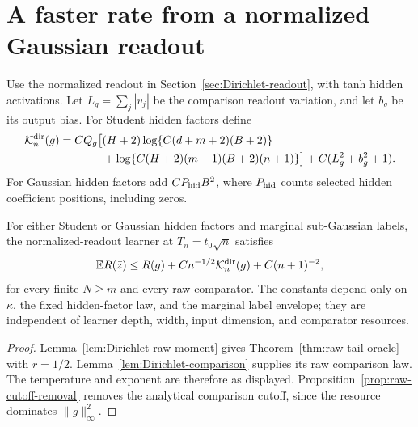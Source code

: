 \section{A faster rate from a normalized Gaussian readout}
\label{sec:dirichlet-raw-oracle}
Use the normalized readout in Section~\ref{sec:Dirichlet-readout}, with
tanh hidden activations. Let $L_g=\sum_j|v_j|$ be the comparison readout variation, and let $b_g$ be its output bias. For Student hidden factors define
\begin{align*}
\mathcal K_n^{\rm dir}(g)=C Q_g\big[&(H+2)\log\{C(d+m+2)(B+2)\}\\
&+\log\{C(H+2)(m+1)(B+2)(n+1)\}\big]+C(L_g^2+b_g^2+1).
\end{align*}
For Gaussian hidden factors add $CP_{\rm hid}B^2$, where $P_{\rm hid}$ counts selected hidden coefficient positions, including zeros.

\begin{corollary}
\label{cor:dirichlet-raw-subgaussian}
For either Student or Gaussian hidden factors and marginal sub-Gaussian labels, the normalized-readout learner at
$T_n=t_0\sqrt n$ satisfies
\[
 \mathbb E R(\bar z)\le R(g)+C n^{-1/2}\mathcal K_n^{\rm dir}(g)
                         +C(n+1)^{-2},
\]
for every finite $N\ge m$ and every raw comparator. The constants depend only on
$\kappa$, the fixed hidden-factor law, and the marginal label envelope; they are independent of
learner depth, width, input dimension, and comparator resources.
\end{corollary}
\begin{proof}
Lemma~\ref{lem:Dirichlet-raw-moment} gives
Theorem~\ref{thm:raw-tail-oracle} with $r=1/2$.
Lemma~\ref{lem:Dirichlet-comparison} supplies its raw comparison law.
The temperature and exponent are therefore as displayed. Proposition~\ref{prop:raw-cutoff-removal} removes the analytical comparison cutoff, since the resource dominates $\|g\|_\infty^2$.
\end{proof}


